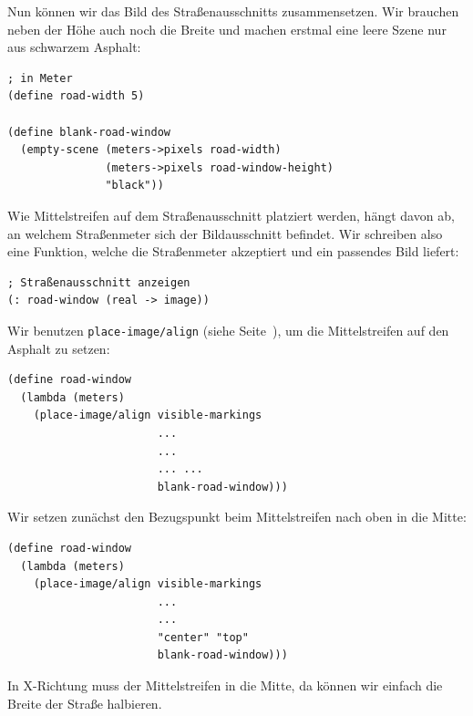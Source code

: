 Nun können wir das Bild des Straßenausschnitts zusammensetzen.  Wir
brauchen neben der Höhe auch noch die Breite und machen erstmal eine
leere Szene nur aus schwarzem Asphalt:
%
\begin{lstlisting}
; in Meter
(define road-width 5)

(define blank-road-window
  (empty-scene (meters->pixels road-width)
               (meters->pixels road-window-height)
               "black"))
\end{lstlisting}
%
Wie Mittelstreifen auf dem Straßenausschnitt platziert werden, hängt
davon ab, an welchem Straßenmeter sich der Bildausschnitt befindet.
Wir schreiben also eine Funktion, welche die Straßenmeter akzeptiert
und ein passendes Bild liefert:
\begin{lstlisting}
; Straßenausschnitt anzeigen
(: road-window (real -> image))
\end{lstlisting}
%
Wir benutzen \lstinline{place-image/align} (siehe
Seite~\pageref{func:place-image-align}), um die Mittelstreifen auf den
Asphalt zu setzen:
%
\begin{lstlisting}
(define road-window
  (lambda (meters)
    (place-image/align visible-markings
                       ...
                       ...
                       ... ...
                       blank-road-window)))
\end{lstlisting}
%
Wir setzen zunächst den Bezugspunkt beim Mittelstreifen nach oben in
die Mitte:
%
\begin{lstlisting}
(define road-window
  (lambda (meters)
    (place-image/align visible-markings
                       ...
                       ...
                       "center" "top"
                       blank-road-window)))
\end{lstlisting}
%
In X-Richtung muss der Mittelstreifen in die Mitte, da können wir
einfach die Breite der Straße halbieren.

